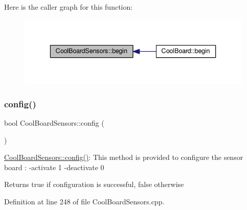 Here is the caller graph for this function\+:\nopagebreak
\begin{figure}[H]
\begin{center}
\leavevmode
\includegraphics[width=336pt]{de/d46/class_cool_board_sensors_a97095823ef7c8f5290812f1405b966b3_icgraph}
\end{center}
\end{figure}
\mbox{\label{class_cool_board_sensors_a9a218895c5423375c33c08f2c56fb23a}} 
\subsubsection{\texorpdfstring{config()}{config()}}
{\footnotesize\ttfamily bool Cool\+Board\+Sensors\+::config (\begin{DoxyParamCaption}{ }\end{DoxyParamCaption})}

\hyperlink{class_cool_board_sensors_a9a218895c5423375c33c08f2c56fb23a}{Cool\+Board\+Sensors\+::config()}\+: This method is provided to configure the sensor board \+: -\/activate 1 -\/deactivate 0

\begin{DoxyReturn}{Returns}
true if configuration is successful, false otherwise 
\end{DoxyReturn}


Definition at line 248 of file Cool\+Board\+Sensors.\+cpp.



